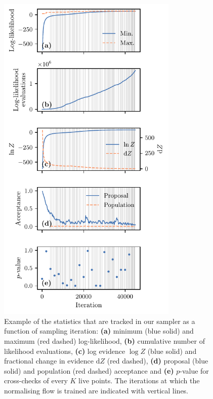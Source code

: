 \documentclass[%
 reprint,
nofootinbib,
 amsmath,amssymb,
 aps,
 prd,
]{revtex4-2}
\newcommand{\figwidth}{8.6cm}
\begin{document}
\begin{figure}[ht]
    \centering
    \includegraphics[width=\figwidth]{figures/state.pdf}
    \caption{Example of the statistics that are tracked in our sampler as a function of sampling iteration: \textbf{(a)} minimum  (blue solid) and maximum (red dashed) log-likelihood, \textbf{(b)} cumulative number of likelihood evaluations, \textbf{(c)} log evidence $\log Z$ (blue solid) and fractional change in evidence $\text{d}Z$ (red dashed), \textbf{(d)} proposal (blue solid) and population (red dashed) acceptance and \textbf{(e)} $p$-value for cross-checks of every $K$ live points. The iterations at which the normalising flow is trained are indicated with vertical lines.}
    \label{fig:state}
\end{figure}
\end{document}
